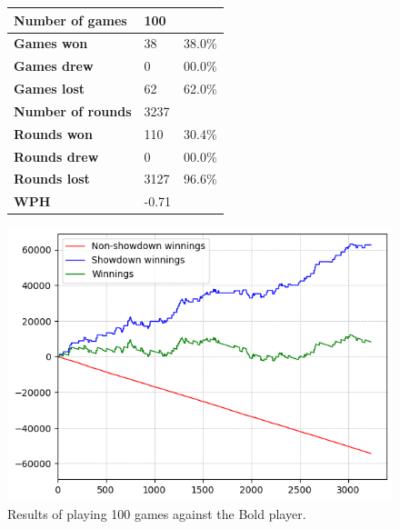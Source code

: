 \begin{figure}[H]
    \centering
    \begin{minipage}{\textwidth}
        \begin{minipage}{0.40\textwidth}
            \begin{tabular}{|l|l|l|}
                \hline
                \textbf{Number of games}  & 100   &        \\ \hline
                \textbf{Games won}        & 38    & 38.0\% \\ \hline
                \textbf{Games drew}       & 0     & 00.0\%  \\ \hline
                \textbf{Games lost}       & 62    & 62.0\% \\ \hline
                \textbf{Number of rounds} & 3237  &        \\ \hline
                \textbf{Rounds won}       & 110   & 30.4\%  \\ \hline
                \textbf{Rounds drew}      & 0     & 00.0\%  \\ \hline
                \textbf{Rounds lost}      & 3127  & 96.6\% \\ \hline
                \textbf{WPH}              & -0.71 &        \\ \hline
            \end{tabular}
        \end{minipage}
        \hspace{0.05\textwidth}
        \begin{minipage}{0.5\textwidth}
            \includegraphics[width=\textwidth]{graphics/bold.png}
        \end{minipage}
    \end{minipage}
    \caption{Results of playing 100 games against the Bold player.}
    \label{fig:results_bold}
\end{figure}

